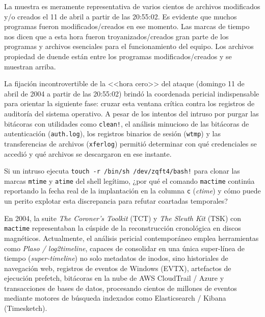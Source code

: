 \vspace{1em} 

La muestra es meramente representativa de varios cientos de archivos
modificados y/o creados el 11 de abril a partir de las 20:55:02. Es
evidente que muchos programas fueron modificados/creados en ese
momento. Las marcas de tiempo nos dicen que a esta hora fueron
troyanizados/creados gran parte de los programas y archivos esenciales
para el funcionamiento del equipo. Los archivos propiedad de duende
están entre los programas modificados/creados y se muestran arriba.

La fijación incontrovertible de la <<hora cero>> del ataque (domingo 11 de abril de 2004 a partir de las 20:55:02) brindó la coordenada pericial indispensable para orientar la siguiente fase: cruzar esta ventana crítica contra los registros de auditoría del sistema operativo. A pesar de los intentos del intruso por purgar las bitácoras con utilidades como \texttt{clean!}, el análisis minucioso de las bitácoras de autenticación (\texttt{auth.log}), los registros binarios de sesión (\texttt{wtmp}) y las transferencias de archivos (\texttt{xferlog}) permitió determinar con qué credenciales se accedió y qué archivos se descargaron en ese instante.

\begin{retoforense}
Si un intruso ejecuta \texttt{touch -r /bin/sh /dev/zqft4/bash!} para clonar las marcas \texttt{mtime} y \texttt{atime} del shell legítimo, ¿por qué el comando \texttt{mactime} continúa reportando la fecha real de la implantación en la columna \texttt{c} (\textit{ctime}) y cómo puede un perito explotar esta discrepancia para refutar coartadas temporales?
\end{retoforense}

\begin{perspectiva20}
En 2004, la suite \textit{The Coroner's Toolkit} (TCT) y \textit{The Sleuth Kit} (TSK) con \texttt{mactime} representaban la cúspide de la reconstrucción cronológica en discos magnéticos. Actualmente, el análisis pericial contemporáneo emplea herramientas como \textit{Plaso / log2timeline}, capaces de consolidar en una única super-línea de tiempo (\textit{super-timeline}) no solo metadatos de inodos, sino historiales de navegación web, registros de eventos de Windows (EVTX), artefactos de ejecución prefetch, bitácoras en la nube de AWS CloudTrail / Azure y transacciones de bases de datos, procesando cientos de millones de eventos mediante motores de búsqueda indexados como Elasticsearch / Kibana (Timesketch).
\end{perspectiva20}

